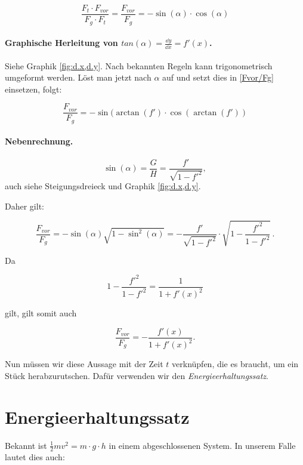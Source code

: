 \begin{equation}\label{Fvor/Fg}
 \frac{F_t \cdot F_{vor}}{F_g \cdot F_t}
 = \frac{F_{vor}}{F_g}=-\sin(\alpha) \cdot \cos (\alpha)
\end{equation}

\paragraph{Graphische Herleitung von $tan(\alpha)=\frac{\dd y}{\dd x}=f'(x)$.}
Siehe Graphik \ref{fig:d.x,d.y}.
Nach bekannten Regeln kann trigonometrisch umgeformt werden.
Löst man jetzt nach $\alpha$ auf und setzt dies in \ref{Fvor/Fg} einsetzen, folgt:

$$
 \frac{F_{vor}}{F_g}=-\sin(\arctan (f') \cdot \cos (\arctan(f'))
$$

\paragraph{Nebenrechnung.}
$$\sin (\alpha)=\frac{G}{H}=\frac{f'}{\sqrt{1-f'^2}},$$ auch siehe Steigungsdreieck und Graphik \ref{fig:d.x,d.y}. 

Daher gilt:

\begin{equation}
\frac{F_{vor}}{F_g}= - \sin(\alpha) \sqrt{1-\sin^2(\alpha)} = - \frac{f'}{\sqrt{1-f'^2}}\cdot \sqrt{1-\frac{f'^2}{1-f'^2}}\,.
\end{equation}

Da 

\begin{equation}
1-\frac{f'^2}{1-f'^2}= \frac{1}{1+f'(x)^2}
\end{equation}

gilt, gilt somit auch

\begin{equation}
 \frac{F_{vor}}{F_g}= - \frac{f'(x)}{1+f'(x)^2}.
\end{equation}

Nun müssen wir diese Aussage mit der Zeit $t$ verknüpfen, die es braucht, um ein Stück herabzurutschen.
Dafür verwenden wir den \textit{Energieerhaltungssatz}.

\section{Energieerhaltungssatz} 

Bekannt ist $\frac{1}{2}mv^2=m\cdot g\cdot h$ in einem abgeschlossenen System.
In unserem Falle lautet dies auch:

